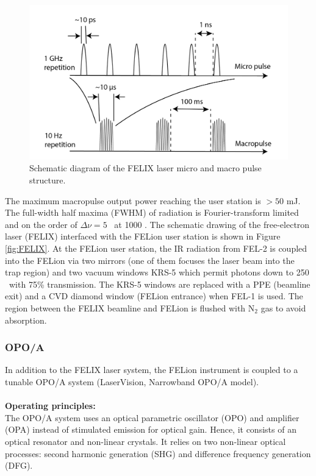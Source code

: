\begin{figure}[!htb]
    \centering
    \includegraphics[scale=0.7]{figures/Instruments/FELIX-pulse-02.png}
    \caption{Schematic diagram of the FELIX laser micro and macro pulse structure.}
    \label{fig:FELIX-pulse}
\end{figure}

The maximum macropulse output power reaching the user station is $> 50$ mJ. The full-width half maxima (FWHM) of radiation is Fourier-transform limited and on the order of $\Delta \nu = 5$ \wn\ at 1000 \wn. The schematic drawing of the free-electron laser (FELIX) interfaced with the FELion user station is shown in Figure \ref{fig:FELIX}. At the FELion user station, the IR radiation from FEL-2 is coupled into the FELion via two mirrors (one of them focuses the laser beam into the trap region) and two vacuum windows KRS-5 which permit photons down to 250 \wn\ with 75\% transmission. The KRS-5 windows are replaced with a PPE (beamline exit) and a CVD diamond window (FELion entrance) when FEL-1 is used. The region between the FELIX beamline and FELion is flushed with N$_2$ gas to avoid absorption.

\subsubsection{OPO/A}
\label{subsec:ir:radiation-source:OPO}

In addition to the FELIX laser system, the FELion instrument is coupled to a tunable OPO/A system (LaserVision, Narrowband OPO/A model).\\
\\
\textbf{Operating principles:}\\

The OPO/A system uses an optical parametric oscillator (OPO) and amplifier (OPA) instead of stimulated emission for optical gain. Hence, it consists of an optical resonator and non-linear crystals. It relies on two non-linear optical processes: second harmonic generation (SHG) and difference frequency generation (DFG).\\


